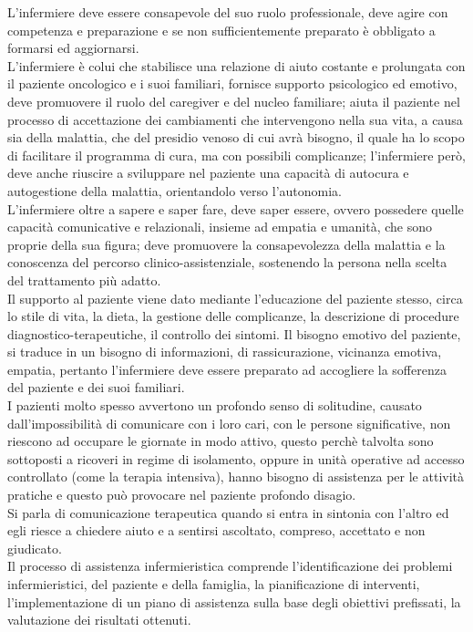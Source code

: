 L’infermiere deve essere consapevole del suo ruolo professionale, deve agire con competenza e preparazione e se non 
sufficientemente preparato è obbligato a formarsi ed aggiornarsi.\\ 
L’infermiere è colui che stabilisce una relazione di aiuto costante e prolungata con il paziente oncologico e i suoi 
familiari, fornisce supporto psicologico ed emotivo, deve promuovere il ruolo del caregiver e del nucleo familiare; 
aiuta il paziente nel processo di accettazione dei cambiamenti 
che intervengono nella sua vita, a causa sia della malattia, che del presidio venoso di cui 
avrà bisogno, il quale ha lo scopo di facilitare il programma di cura, ma con possibili complicanze; l’infermiere però, 
deve anche riuscire a sviluppare nel paziente una capacità di autocura e autogestione della malattia, orientandolo 
verso l’autonomia.\\
L’infermiere oltre a sapere e saper fare, deve saper essere, ovvero possedere quelle capacità comunicative e 
relazionali, insieme ad empatia e umanità, che sono proprie della sua figura; deve promuovere la 
consapevolezza della malattia e la conoscenza del percorso clinico-assistenziale, sostenendo la persona nella 
scelta del trattamento più adatto\cite{COMUNICAZIONE}.\\
Il supporto al paziente viene dato mediante l’educazione del paziente stesso, circa lo stile di vita, la dieta, la 
gestione delle complicanze, la descrizione di procedure diagnostico-terapeutiche, il controllo dei sintomi. 
Il bisogno emotivo del paziente, si traduce in un bisogno di informazioni, di rassicurazione, vicinanza emotiva, 
empatia, pertanto l’infermiere deve essere preparato ad accogliere la sofferenza del paziente e dei suoi familiari.\\
I pazienti molto spesso avvertono un profondo senso di solitudine, causato dall’impossibilità di comunicare con i 
loro cari, con le persone significative, non riescono ad occupare le giornate in modo attivo, questo 
perchè talvolta sono sottoposti a ricoveri in regime di isolamento, oppure in unità operative ad accesso controllato 
(come la terapia intensiva), hanno bisogno di assistenza per le attività pratiche e questo può provocare 
nel paziente profondo disagio.\\
Si parla di comunicazione terapeutica quando si entra in sintonia con l’altro ed egli riesce a chiedere aiuto e a 
sentirsi ascoltato, compreso, accettato e non giudicato\cite{NURSE24}.\\
Il processo di assistenza infermieristica comprende l'identificazione dei problemi infermieristici, del paziente e 
della famiglia, la pianificazione di interventi, l’implementazione di un piano di assistenza sulla base degli 
obiettivi prefissati, la valutazione dei risultati ottenuti.

